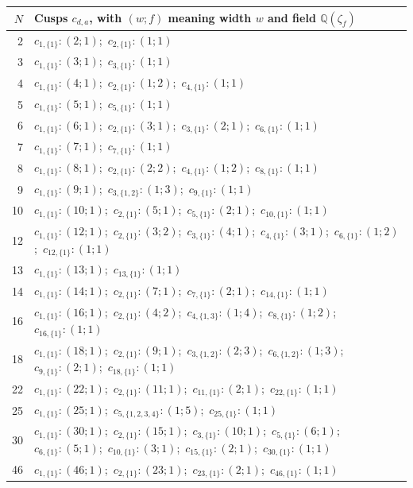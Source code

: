 \begin{longtable}{r|p{}}
$N$ & Cusps $c_{d,a}$, with $(w;f)$ meaning width $w$ and field $\mathbb Q(\zeta_f)$\\\hline
2 & $c_{1,\{1\}}:(2;1)$;\ $c_{2,\{1\}}:(1;1)$\\
3 & $c_{1,\{1\}}:(3;1)$;\ $c_{3,\{1\}}:(1;1)$\\
4 & $c_{1,\{1\}}:(4;1)$;\ $c_{2,\{1\}}:(1;2)$;\ $c_{4,\{1\}}:(1;1)$\\
5 & $c_{1,\{1\}}:(5;1)$;\ $c_{5,\{1\}}:(1;1)$\\
6 & $c_{1,\{1\}}:(6;1)$;\ $c_{2,\{1\}}:(3;1)$;\ $c_{3,\{1\}}:(2;1)$;\ $c_{6,\{1\}}:(1;1)$\\
7 & $c_{1,\{1\}}:(7;1)$;\ $c_{7,\{1\}}:(1;1)$\\
8 & $c_{1,\{1\}}:(8;1)$;\ $c_{2,\{1\}}:(2;2)$;\ $c_{4,\{1\}}:(1;2)$;\ $c_{8,\{1\}}:(1;1)$\\
9 & $c_{1,\{1\}}:(9;1)$;\ $c_{3,\{1,2\}}:(1;3)$;\ $c_{9,\{1\}}:(1;1)$\\
10 & $c_{1,\{1\}}:(10;1)$;\ $c_{2,\{1\}}:(5;1)$;\ $c_{5,\{1\}}:(2;1)$;\ $c_{10,\{1\}}:(1;1)$\\
12 & $c_{1,\{1\}}:(12;1)$;\ $c_{2,\{1\}}:(3;2)$;\ $c_{3,\{1\}}:(4;1)$;\ $c_{4,\{1\}}:(3;1)$;\ $c_{6,\{1\}}:(1;2)$;\ $c_{12,\{1\}}:(1;1)$\\
13 & $c_{1,\{1\}}:(13;1)$;\ $c_{13,\{1\}}:(1;1)$\\
14 & $c_{1,\{1\}}:(14;1)$;\ $c_{2,\{1\}}:(7;1)$;\ $c_{7,\{1\}}:(2;1)$;\ $c_{14,\{1\}}:(1;1)$\\
16 & $c_{1,\{1\}}:(16;1)$;\ $c_{2,\{1\}}:(4;2)$;\ $c_{4,\{1,3\}}:(1;4)$;\ $c_{8,\{1\}}:(1;2)$;\ $c_{16,\{1\}}:(1;1)$\\
18 & $c_{1,\{1\}}:(18;1)$;\ $c_{2,\{1\}}:(9;1)$;\ $c_{3,\{1,2\}}:(2;3)$;\ $c_{6,\{1,2\}}:(1;3)$;\ $c_{9,\{1\}}:(2;1)$;\ $c_{18,\{1\}}:(1;1)$\\
22 & $c_{1,\{1\}}:(22;1)$;\ $c_{2,\{1\}}:(11;1)$;\ $c_{11,\{1\}}:(2;1)$;\ $c_{22,\{1\}}:(1;1)$\\
25 & $c_{1,\{1\}}:(25;1)$;\ $c_{5,\{1,2,3,4\}}:(1;5)$;\ $c_{25,\{1\}}:(1;1)$\\
30 & $c_{1,\{1\}}:(30;1)$;\ $c_{2,\{1\}}:(15;1)$;\ $c_{3,\{1\}}:(10;1)$;\ $c_{5,\{1\}}:(6;1)$;\ $c_{6,\{1\}}:(5;1)$;\ $c_{10,\{1\}}:(3;1)$;\ $c_{15,\{1\}}:(2;1)$;\ $c_{30,\{1\}}:(1;1)$\\
46 & $c_{1,\{1\}}:(46;1)$;\ $c_{2,\{1\}}:(23;1)$;\ $c_{23,\{1\}}:(2;1)$;\ $c_{46,\{1\}}:(1;1)$\\
\end{longtable}
